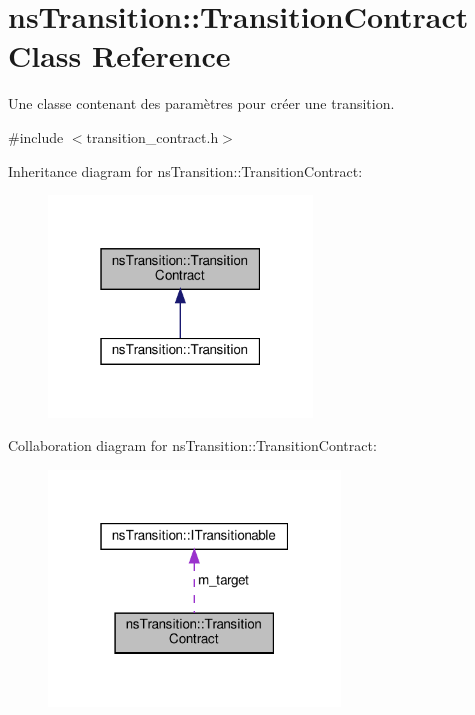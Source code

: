 \hypertarget{classns_transition_1_1_transition_contract}{}\section{ns\+Transition\+:\+:Transition\+Contract Class Reference}
\label{classns_transition_1_1_transition_contract}


Une classe contenant des paramètres pour créer une transition.  




{\ttfamily \#include $<$transition\+\_\+contract.\+h$>$}



Inheritance diagram for ns\+Transition\+:\+:Transition\+Contract\+:
\nopagebreak
\begin{figure}[H]
\begin{center}
\leavevmode
\includegraphics[width=199pt]{classns_transition_1_1_transition_contract__inherit__graph}
\end{center}
\end{figure}


Collaboration diagram for ns\+Transition\+:\+:Transition\+Contract\+:
\nopagebreak
\begin{figure}[H]
\begin{center}
\leavevmode
\includegraphics[width=220pt]{classns_transition_1_1_transition_contract__coll__graph}
\end{center}
\end{figure}
